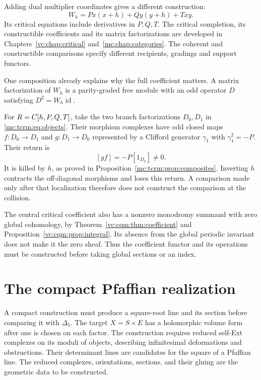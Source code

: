 Adding dual multiplier coordinates gives a different construction:
\begin{equation}\label{op:eq:critical-triangle}
 W_h=Px(x+h)+Qy(y+h)+Txy.
\end{equation}
Its critical equations include derivatives in $P,Q,T$.
The critical completion, its constructible coefficients and its
matrix factorizations are developed in
Chapters~\ref{vc:chap:critical} and~\ref{mc:chap:categories}.
The coherent and constructible comparisons specify different
recipients, gradings and support functors.

One composition already explains why the full coefficient matters.
A matrix factorization of $W_h$ is a parity-graded free module
with an odd operator $D$ satisfying $D^2=W_h\operatorname{id}$.

For $R=C[h,P,Q,T]$, take the two branch factorizations
$D_0,D_1$ in \eqref{mc:tcrm:eq:objects}.
Their morphism complexes have odd closed maps
$f:D_0\to D_1$ and $g:D_1\to D_0$ represented by a Clifford
generator $\gamma_1$ with $\gamma_1^2=-P$.
Their return is
\[
 [g f]=-P[1_{D_0}]\ne0.
\]
It is killed by $h$, as proved in
Proposition~\ref{mc:tcrm:prop:composites}.
Inverting $h$ contracts the off-diagonal morphisms and loses this
return. A comparison made only after that localization therefore
does not construct the comparison at the collision.

The central critical coefficient also has a nonzero monodromy
summand with zero global cohomology, by
Theorem~\ref{vc:cqm:thm:coefficient} and
Proposition~\ref{vc:cqm:prop:integral}.
Its absence from the global periodic invariant does not make it
the zero sheaf. Thus the coefficient functor and its operations
must be constructed before taking global sections or an index.

\section{The compact Pfaffian realization}
\label{sec:edge-2-3}

A compact construction must produce a square-root line and its
section before comparing it with \(\Delta_5\). The target
\(X=S\times E\) has a holomorphic volume form after one is chosen
on each factor. The construction requires reduced self-Ext complexes
on its moduli of objects, describing infinitesimal deformations and
obstructions. Their determinant lines are candidates for the square
of a Pfaffian line. The reduced complexes, orientations, sections,
and their gluing are the geometric data to be constructed.


